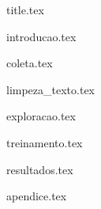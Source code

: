 \documentclass{article}
\begin{document}

{title.tex}

\pagebreak

\tableofcontents{}

\pagebreak

{introducao.tex}

\pagebreak

{coleta.tex}

\pagebreak

{limpeza_texto.tex}

\pagebreak

{exploracao.tex}

\pagebreak

{treinamento.tex}

\pagebreak



\pagebreak

{resultados.tex}

\pagebreak



\pagebreak



\pagebreak

{apendice.tex}
\end{document}
